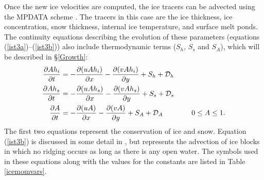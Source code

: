 Once the new ice velocities are computed, the ice tracers can be
advected using the MPDATA scheme \citep{Smolark90}. The tracers in
this case are the ice thickness, ice concentration, snow thickness,
internal ice temperature, and surface melt ponds. The continuity
equations describing the evolution of these parameters (equations
(\ref{ist3a})--(\ref{ist3b})) also include thermodynamic terms ($S_h$,
$S_s$ and $S_A$), which will be described in \S\ref{Growth}:
\begin{align}
  \frac{\partial A h_i }{ \partial t} & =
  - \frac{\partial (u A h_i) }{ \partial x} -
  \frac{\partial (v A h_i) }{ \partial y}
  + S_h + {\cal D}_h
\label{ist3a} \\
  \frac{\partial A h_s }{ \partial t} & =
  - \frac{\partial (u A h_s) }{ \partial x} -
  \frac{\partial (v A h_s) }{ \partial y}
  + S_s + {\cal D}_s
\label{ist3c} \\
  \frac{\partial A }{ \partial t} & =
  - \frac{\partial (uA) }{ \partial x} - \frac{\partial (vA) }{ \partial y}
  + S_A + {\cal D}_A \qquad \qquad 0 \leq A \leq 1 .
\label{ist3b}
\end{align}
The first two equations represent the conservation of ice and snow.
Equation (\ref{ist3b}) is discussed in some detail in \citet{Mellor89}, but
represents the advection of ice blocks in which no ridging occurs as
long as there is any open water.
%
The symbols used in these equations along with the values for the
constants are listed in Table \ref{icemomvars}.

